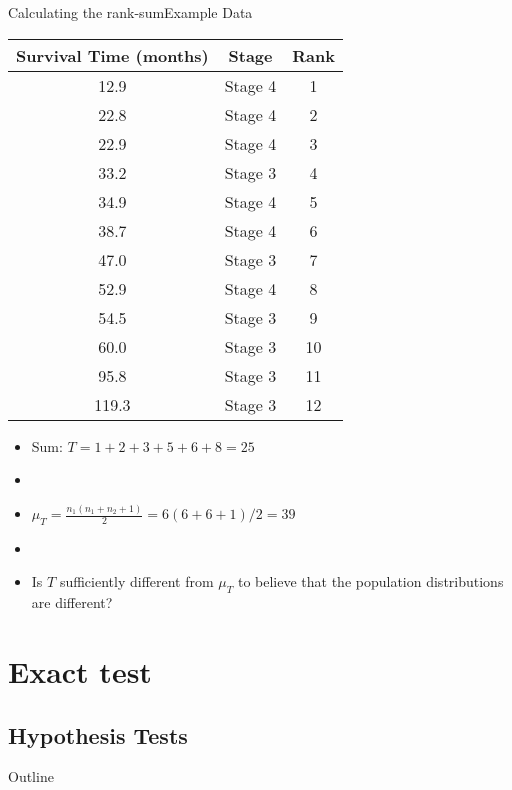 \documentclass[xcolor=dvipsnames]{beamer}
\begin{document}
\begin{frame}{Calculating the rank-sum}{Example Data}
\begin{center}{\tiny
	\begin{tabular}{|c|c|c|}
		\hline
		\textbf{Survival Time (months)} &  \textbf{Stage} & \textbf{Rank}\\ \hline \hline
		12.9 &Stage 4 & 1 \\ \hline
		22.8 &Stage 4 & 2\\ \hline
		22.9& Stage 4 & 3\\ \hline
		33.2 &Stage 3 & 4\\ \hline
		34.9& Stage 4 & 5\\ \hline
		38.7 &Stage 4 & 6\\ \hline
		47.0 &Stage 3 & 7\\ \hline		
		52.9  &Stage 4 & 8\\ \hline
		54.5 &Stage 3 & 9\\ \hline				
		60.0 &Stage 3 & 10\\ \hline
		95.8& Stage 3 & 11\\ \hline
		119.3 &Stage 3 & 12\\ \hline
	\end{tabular}}
\end{center}
\begin{itemize}
	\item Sum: $T = 1 + 2 + 3 + 5 + 6 + 8 = 25$
	\item[]
	\item $\mu_T = \frac{n_1 (n_1 + n_2 + 1)}{2} = 6(6+6+1)/2 = 39$
	\item[]
	\item Is $T$ sufficiently different from $\mu_T$ to believe that the population distributions are different?
\end{itemize}
\end{frame}

\section{Exact test}

\subsection{Hypothesis Tests}
\begin{frame}{Outline}
\tableofcontents[currentsection,subsectionstyle=show/shaded/hide]
\end{frame}
\end{document}
